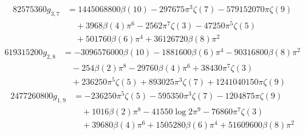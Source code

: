\begin{equation}\begin{split}82575360 g_{3,7} &= 1445068800 \beta(10) - 297675 \pi^{3} \zeta(7) - 579152070 \pi \zeta(9)\\ &\quad {}+3968 \beta(4) \pi^{6} - 2562 \pi^{7} \zeta(3) - 47250 \pi^{5} \zeta(5)\\ &\quad {}+501760 \beta(6) \pi^{4} + 36126720 \beta(8) \pi^{2}\end{split}\end{equation}
\begin{equation}\begin{split}619315200 g_{2,8} &= - 3096576000 \beta(10) - 1881600 \beta(6) \pi^{4} - 90316800 \beta(8) \pi^{2}\\ &\quad {}- 254 \beta(2) \pi^{8} - 29760 \beta(4) \pi^{6} + 38430 \pi^{7} \zeta(3)\\ &\quad {}+236250 \pi^{5} \zeta(5) + 893025 \pi^{3} \zeta(7) + 1241040150 \pi \zeta(9)\end{split}\end{equation}
\begin{equation}\begin{split}2477260800 g_{1,9} &= - 236250 \pi^{5} \zeta(5) - 595350 \pi^{3} \zeta(7) - 1204875 \pi \zeta(9)\\ &\quad {}+1016 \beta(2) \pi^{8} - 41550 \log 2 \pi^{9} - 76860 \pi^{7} \zeta(3)\\ &\quad {}+39680 \beta(4) \pi^{6} + 1505280 \beta(6) \pi^{4} + 51609600 \beta(8) \pi^{2}\end{split}\end{equation}
